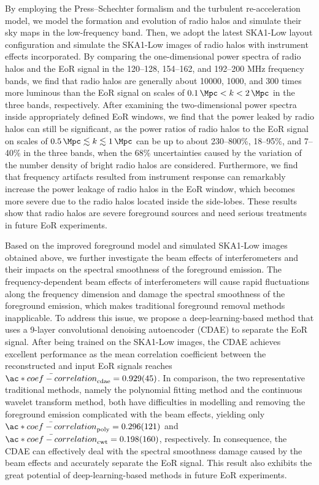 \begin{englishabstract}
By employing the Press--Schechter formalism and the turbulent
re-acceleration model, we model the formation and evolution of
radio halos and simulate their sky maps in the low-frequency band.
Then, we adopt the latest SKA1-Low layout configuration and simulate
the SKA1-Low images of radio halos with instrument effects incorporated.
By comparing the one-dimensional power spectra of radio halos and
the EoR signal in the \numrange{120}{128}, \numrange{154}{162},
and \numrange{192}{200} \si{\MHz} frequency bands, we find that
radio halos are generally about \num{10000}, 1000, and 300
times more luminous than the EoR signal on scales of
$\SI{0.1}{\per\Mpc} < k < \SI{2}{\per\Mpc}$ in the three bands,
respectively.
After examining the two-dimensional power spectra inside appropriately
defined EoR windows, we find that the power leaked by radio halos can
still be significant, as the power ratios of radio halos to the
EoR signal on scales of
$\SI{0.5}{\per\Mpc} \lesssim k \lesssim \SI{1}{\per\Mpc}$ can be up to
about \numrange{230}{800}\%, \numrange{18}{95}\%, and \numrange{7}{40}\%
in the three bands, when the 68\% uncertainties caused by the variation
of the number density of bright radio halos are considered.
Furthermore, we find that frequency artifacts resulted from instrument
response can remarkably increase the power leakage of radio halos in
the EoR window, which becomes more severe due to the radio halos
located inside the side-lobes.
These results show that radio halos are severe foreground sources
and need serious treatments in future EoR experiments.

Based on the improved foreground model and simulated SKA1-Low images
obtained above, we further investigate the beam effects of
interferometers and their impacts on the spectral smoothness of
the foreground emission.
The frequency-dependent beam effects of interferometers will cause
rapid fluctuations along the frequency dimension and damage the
spectral smoothness of the foreground emission, which makes
traditional foreground removal methods inapplicable.
To address this issue, we propose a deep-learning-based method
that uses a 9-layer convolutional denoising autoencoder (CDAE) to
separate the EoR signal.
After being trained on the SKA1-Low images, the CDAE achieves excellent
performance as the mean correlation coefficient between 
the reconstructed and input EoR signals reaches
$\bar{\ac*{coef-correlation}}_{\R{cdae}} = \num{0.929 +- 0.045}$.
In comparison, the two representative traditional methods, namely the
polynomial fitting method and the continuous wavelet transform method,
both have difficulties in modelling and removing the foreground emission
complicated with the beam effects, yielding only
$\bar{\ac*{coef-correlation}}_{\R{poly}} = \num{0.296 +- 0.121}$ and
$\bar{\ac*{coef-correlation}}_{\R{cwt}} = \num{0.198 +- 0.160}$,
respectively.
In consequence, the CDAE can effectively deal with the spectral
smoothness damage caused by the beam effects and accurately separate
the EoR signal.
This result also exhibits the great potential of deep-learning-based
methods in future EoR experiments.

\end{englishabstract}
